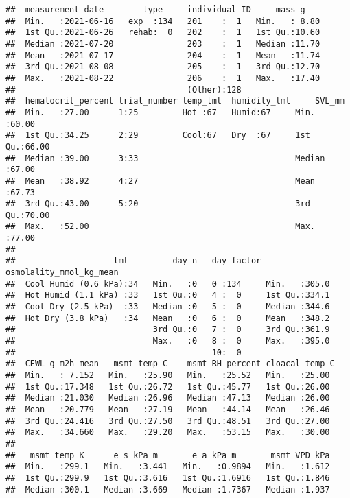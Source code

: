 \documentclass[
]{article}
\begin{document}
\begin{verbatim}
##  measurement_date        type     individual_ID     mass_g     
##  Min.   :2021-06-16   exp  :134   201    :  1   Min.   : 8.80  
##  1st Qu.:2021-06-26   rehab:  0   202    :  1   1st Qu.:10.60  
##  Median :2021-07-20               203    :  1   Median :11.70  
##  Mean   :2021-07-17               204    :  1   Mean   :11.74  
##  3rd Qu.:2021-08-08               205    :  1   3rd Qu.:12.70  
##  Max.   :2021-08-22               206    :  1   Max.   :17.40  
##                                   (Other):128                  
##  hematocrit_percent trial_number temp_tmt  humidity_tmt     SVL_mm     
##  Min.   :27.00      1:25         Hot :67   Humid:67     Min.   :60.00  
##  1st Qu.:34.25      2:29         Cool:67   Dry  :67     1st Qu.:66.00  
##  Median :39.00      3:33                                Median :67.00  
##  Mean   :38.92      4:27                                Mean   :67.73  
##  3rd Qu.:43.00      5:20                                3rd Qu.:70.00  
##  Max.   :52.00                                          Max.   :77.00  
##                                                                        
##                    tmt         day_n   day_factor osmolality_mmol_kg_mean
##  Cool Humid (0.6 kPa):34   Min.   :0   0 :134     Min.   :305.0          
##  Hot Humid (1.1 kPa) :33   1st Qu.:0   4 :  0     1st Qu.:334.1          
##  Cool Dry (2.5 kPa)  :33   Median :0   5 :  0     Median :344.6          
##  Hot Dry (3.8 kPa)   :34   Mean   :0   6 :  0     Mean   :348.2          
##                            3rd Qu.:0   7 :  0     3rd Qu.:361.9          
##                            Max.   :0   8 :  0     Max.   :395.0          
##                                        10:  0                            
##  CEWL_g_m2h_mean   msmt_temp_C    msmt_RH_percent cloacal_temp_C 
##  Min.   : 7.152   Min.   :25.90   Min.   :25.52   Min.   :25.00  
##  1st Qu.:17.348   1st Qu.:26.72   1st Qu.:45.77   1st Qu.:26.00  
##  Median :21.030   Median :26.96   Median :47.13   Median :26.00  
##  Mean   :20.779   Mean   :27.19   Mean   :44.14   Mean   :26.46  
##  3rd Qu.:24.416   3rd Qu.:27.50   3rd Qu.:48.51   3rd Qu.:27.00  
##  Max.   :34.660   Max.   :29.20   Max.   :53.15   Max.   :30.00  
##                                                                  
##   msmt_temp_K      e_s_kPa_m       e_a_kPa_m       msmt_VPD_kPa  
##  Min.   :299.1   Min.   :3.441   Min.   :0.9894   Min.   :1.612  
##  1st Qu.:299.9   1st Qu.:3.616   1st Qu.:1.6916   1st Qu.:1.846  
##  Median :300.1   Median :3.669   Median :1.7367   Median :1.937  

\end{verbatim}
\end{document}
